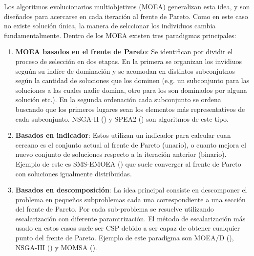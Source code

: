 Los algoritmos evolucionarios multiobjetivos (MOEA) generalizan esta idea, y son diseñados para acercarse en cada iteraci\'on  al frente de Pareto. Como en este caso no existe soluci\'on \'unica, la manera de selccionar los individuos cambia fundamentalmente. Dentro de los MOEA existen tres paradigmas principales:

\begin{enumerate}
    \item \textbf{MOEA basados en el frente de Pareto}\label{def:MOEA}: Se identifican por dividir el proceso de selecci\'on en dos etapas. En la primera se organizan los invidiuos segu\'un su ind\'ice de dominaci\'on y se acomodan en distintos subconjutnos seg\'un la cantidad de soluciones que los dominen (e.g. un subconjunto para las soluciones a las cuales nadie domina, otro para los son dominados por alguna soluci\'on etc.). En la segunda ordenaci\'on cada subconjunto se ordena buscando que los primeros lugares sean los elementos m\'as representativos de cada subconjunto. NSGA-II (\cite{deb2002fast}) y SPEA2 (\cite{zitzler1999multiobjective}) son algoritmos de este tipo.

    \item \textbf{Basados en indicador}: Estos utilizan un indicador para calcular cuan cercano es el conjunto actual al frente de Pareto (unario), o cuanto mejora el nuevo conjunto de soluciones respecto a la iteraci\'on anterior (binario). Ejemplo de este es SMS-EMOEA (\cite{emmerich2005emo}) que suele converger al frente de Pareto con soluciones igualmente distribuidas.

    \item \textbf{Basados en descomposici\'on}: La idea principal consiste en descomponer el problema en pequeños subproblemas cada una correspondiente a una secci\'on del frente de Pareto. Por cada sub-problema se resuelve utilizando escalarizaci\'on con diferente paramtrizaci\'on. El m\'etodo de escalarizaci\'on m\'as usado en estos casos suele ser CSP debido a ser capaz de obtener cualquier punto del frente de Pareto. Ejemplo de este paradigma son MOEA/D (\cite{zhang2007moea}), NSGA-III (\cite{deb2013evolutionary}) y MOMSA (\cite{sharifi2021new}).

\end{enumerate}

